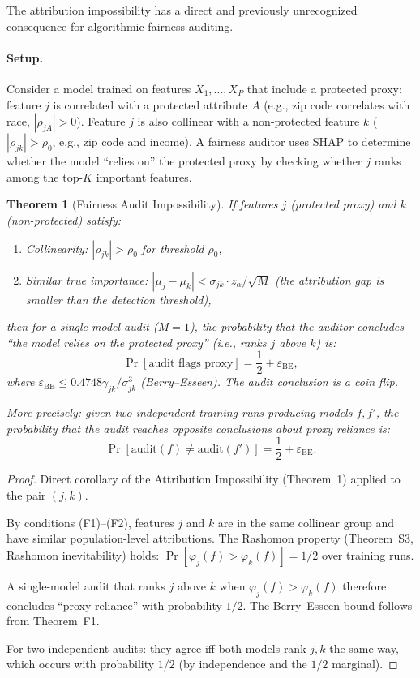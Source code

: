\documentclass{article}
\newtheorem{theorem}{Theorem}
\begin{document}
The attribution impossibility has a direct and previously unrecognized
consequence for algorithmic fairness auditing.

\paragraph{Setup.}
Consider a model trained on features $X_1, \ldots, X_P$ that include
a protected proxy: feature $j$ is correlated with a protected attribute
$A$ (e.g., zip code correlates with race, $|\rho_{jA}| > 0$).
Feature $j$ is also collinear with a non-protected feature $k$
($|\rho_{jk}| > \rho_0$, e.g., zip code and income). A fairness
auditor uses SHAP to determine whether the model ``relies on'' the
protected proxy by checking whether $j$ ranks among the top-$K$
important features.

\begin{theorem}[Fairness Audit Impossibility]
\label{thm:fairness-audit}
If features $j$ (protected proxy) and $k$ (non-protected) satisfy:
\begin{enumerate}
    \item[(F1)] Collinearity: $|\rho_{jk}| > \rho_0$ for
      threshold $\rho_0$,
    \item[(F2)] Similar true importance:
      $|\mu_j - \mu_k| < \sigma_{jk} \cdot z_\alpha / \sqrt{M}$
      (the attribution gap is smaller than the detection threshold),
\end{enumerate}
then for a single-model audit ($M{=}1$), the probability that the
auditor concludes ``the model relies on the protected proxy'' (i.e.,
ranks $j$ above $k$) is:
\[
    \Pr[\text{audit flags proxy}] = \frac{1}{2}
    \pm \varepsilon_{\text{BE}},
\]
where $\varepsilon_{\text{BE}} \leq 0.4748\gamma_{jk}/\sigma_{jk}^3$
(Berry--Esseen). The audit conclusion is a coin flip.

More precisely: given two independent training runs producing
models $f, f'$, the probability that the audit reaches
\emph{opposite conclusions} about proxy reliance is:
\[
    \Pr[\text{audit}(f) \neq \text{audit}(f')] = \frac{1}{2}
    \pm \varepsilon_{\text{BE}}.
\]
\end{theorem}

\begin{proof}
Direct corollary of the Attribution Impossibility (Theorem~1)
applied to the pair $(j, k)$.

By conditions (F1)--(F2), features $j$ and $k$ are in the same
collinear group and have similar population-level attributions.
The Rashomon property (Theorem~S3, Rashomon inevitability) holds:
$\Pr[\varphi_j(f) > \varphi_k(f)] = 1/2$ over training runs.

A single-model audit that ranks $j$ above $k$ when
$\varphi_j(f) > \varphi_k(f)$ therefore concludes ``proxy reliance''
with probability $1/2$. The Berry--Esseen bound follows from
Theorem~F1.

For two independent audits: they agree iff both models rank $j, k$
the same way, which occurs with probability $1/2$ (by independence
and the $1/2$ marginal).
\end{proof}
\end{document}
